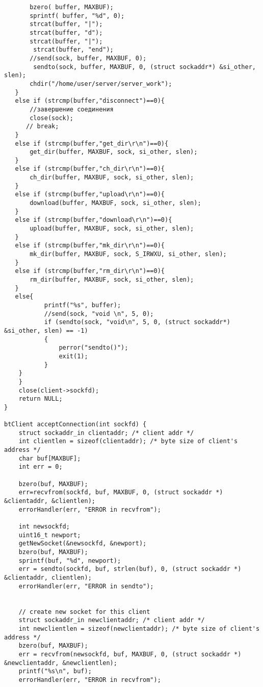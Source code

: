 \documentclass[12pt,a4paper]{report}
\begin{document}
\begin{lstlisting}
       bzero( buffer, MAXBUF);
       sprintf( buffer, "%d", 0);
       strcat(buffer, "|");
       strcat(buffer, "d");
       strcat(buffer, "|");
        strcat(buffer, "end");
       //send(sock, buffer, MAXBUF, 0);
        sendto(sock, buffer, MAXBUF, 0, (struct sockaddr*) &si_other, slen);
       chdir("/home/user/server/server_work");
   }
   else if (strcmp(buffer,"disconnect")==0){
       //завершение соединения
       close(sock);
      // break;
   }
   else if (strcmp(buffer,"get_dir\r\n")==0){
       get_dir(buffer, MAXBUF, sock, si_other, slen);
   }
   else if (strcmp(buffer,"ch_dir\r\n")==0){
       ch_dir(buffer, MAXBUF, sock, si_other, slen);
   }
   else if (strcmp(buffer,"upload\r\n")==0){
       download(buffer, MAXBUF, sock, si_other, slen);
   }
   else if (strcmp(buffer,"download\r\n")==0){
       upload(buffer, MAXBUF, sock, si_other, slen);
   }
   else if (strcmp(buffer,"mk_dir\r\n")==0){
       mk_dir(buffer, MAXBUF, sock, S_IRWXU, si_other, slen);
   }
   else if (strcmp(buffer,"rm_dir\r\n")==0){
       rm_dir(buffer, MAXBUF, sock, si_other, slen);
   }
   else{
           printf("%s", buffer);
           //send(sock, "void \n", 5, 0);
           if (sendto(sock, "void\n", 5, 0, (struct sockaddr*) &si_other, slen) == -1)
           {
               perror("sendto()");
               exit(1);
           }
    }
    }
    close(client->sockfd);
    return NULL;
}

btClient acceptConnection(int sockfd) {
    struct sockaddr_in clientaddr; /* client addr */
    int clientlen = sizeof(clientaddr); /* byte size of client's address */
    char buf[MAXBUF];
    int err = 0;

    bzero(buf, MAXBUF);
    err=recvfrom(sockfd, buf, MAXBUF, 0, (struct sockaddr *) &clientaddr, &clientlen);
    errorHandler(err, "ERROR in recvfrom");

    int newsockfd;
    uint16_t newport;
    getNewSocket(&newsockfd, &newport);
    bzero(buf, MAXBUF);
    sprintf(buf, "%d", newport);
    err = sendto(sockfd, buf, strlen(buf), 0, (struct sockaddr *) &clientaddr, clientlen);
    errorHandler(err, "ERROR in sendto");


    // create new socket for this client
    struct sockaddr_in newclientaddr; /* client addr */
    int newclientlen = sizeof(newclientaddr); /* byte size of client's address */
    bzero(buf, MAXBUF);
    err = recvfrom(newsockfd, buf, MAXBUF, 0, (struct sockaddr *) &newclientaddr, &newclientlen);
    printf("%s\n", buf);
    errorHandler(err, "ERROR in recvfrom");


\end{lstlisting}
\end{document}
